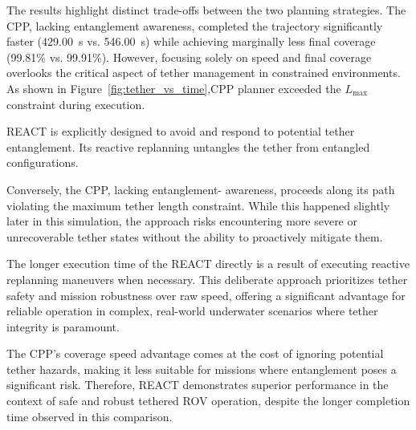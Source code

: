 The results highlight distinct trade-offs between the two planning strategies. The \ac{CPP}, lacking entanglement awareness, completed the trajectory significantly faster (429.00~s vs. 546.00~s) while achieving marginally less final coverage (99.81\% vs. 99.91\%). However, focusing solely on speed and final coverage overlooks the critical aspect of tether management in constrained environments. As shown in Figure~\ref{fig:tether_vs_time},\ac{CPP} planner exceeded the $L_{\text{max}}$ constraint during execution. 

\ac{REACT} is explicitly designed to avoid and respond to potential tether entanglement. Its reactive replanning untangles the tether from entangled configurations. 

Conversely, the \ac{CPP}, lacking entanglement- awareness, proceeds along its path violating the maximum tether length constraint. While this happened slightly later in this simulation, the approach risks encountering more severe or unrecoverable tether states without the ability to proactively mitigate them.

The longer execution time of the \ac{REACT} directly is a result of executing reactive replanning maneuvers when necessary. This deliberate approach prioritizes tether safety and mission robustness over raw speed, offering a significant advantage for reliable operation in complex, real-world underwater scenarios where tether integrity is paramount. 

The \ac{CPP}'s coverage speed advantage comes at the cost of ignoring potential tether hazards, making it less suitable for missions where entanglement poses a significant risk. Therefore, \ac{REACT} demonstrates superior performance in the context of safe and robust tethered \ac{ROV} operation, despite the longer completion time observed in this comparison.